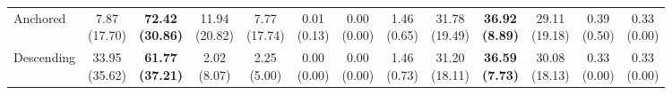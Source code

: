 {\begin{tabular}{l|cccccc|cccccc}
Anchored & \makecell{7.87 \\ (17.70)} & {\cellcolor[HTML]{C8E6C9}} \bfseries \makecell{72.42 \\ (30.86)} & \makecell{11.94 \\ (20.82)} & \makecell{7.77 \\ (17.74)} & \makecell{0.01 \\ (0.13)} & \makecell{0.00 \\ (0.00)} & \makecell{1.46 \\ (0.65)} & {\cellcolor[HTML]{C8E6C9}} \makecell{31.78 \\ (19.49)} & \bfseries \makecell{36.92 \\ (8.89)} & \makecell{29.11 \\ (19.18)} & \makecell{0.39 \\ (0.50)} & \makecell{0.33 \\ (0.00)} \\
Descending & \makecell{33.95 \\ (35.62)} & {\cellcolor[HTML]{C8E6C9}} \bfseries \makecell{61.77 \\ (37.21)} & \makecell{2.02 \\ (8.07)} & \makecell{2.25 \\ (5.00)} & \makecell{0.00 \\ (0.00)} & \makecell{0.00 \\ (0.00)} & \makecell{1.46 \\ (0.73)} & {\cellcolor[HTML]{C8E6C9}} \makecell{31.20 \\ (18.11)} & \bfseries \makecell{36.59 \\ (7.73)} & \makecell{30.08 \\ (18.13)} & \makecell{0.33 \\ (0.00)} & \makecell{0.33 \\ (0.00)} \\
\bottomrule
\end{tabular}
}%
